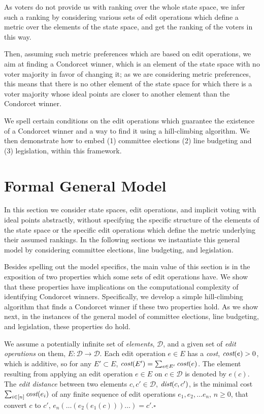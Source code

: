 \documentclass{llncs}
\newcommand{\qqed}{\hfill$\square$}
\newcommand{\calD}{\mathcal{D}}
\newcommand{\dist}{\emph{dist}}
\newcommand{\cost}{\emph{cost}}
\begin{document}
As voters do not provide us with ranking over the whole state space, we infer such a ranking by considering various sets of edit operations which define a metric over the elements of the state space, and get the ranking of the voters in this way.

Then, assuming such metric preferences which are based on edit operations, we aim at finding a Condorcet winner, which is an element of the state space with no voter majority in favor of changing it; as we are considering metric preferences, this means that there is no other element of the state space for which there is a voter majority whose ideal points are closer to another element than the Condorcet winner.

We spell certain conditions on the edit operations which guarantee the existence of a Condorcet winner and a way to find it using a hill-climbing algorithm. We then demonstrate how to embed (1) committee elections (2) line budgeting and (3) legislation, within this framework.


\section{Formal General Model}

In this section we consider state spaces, edit operations, and implicit voting with ideal points abstractly, without specifying the specific structure of the elements of the state space or the specific edit operations which define the metric underlying their assumed rankings.
%
In the following sections we instantiate this general model by considering committee elections, line budgeting, and legislation.

Besides spelling out the model specifics, the main value of this section is in the exposition of two properties which some sets of edit operations have.  We show that these properties have implications on the computational complexity of identifying Condorcet winners.
Specifically, we develop a simple hill-climbing algorithm that  finds a Condorcet winner if these two properties hold.
%
As we show next, in the instances of the general model of committee elections, line budgeting, and legislation, these properties do hold.

\begin{definition}
%
We assume a potentially infinite set of \emph{elements}, $\calD$, and a given set of \emph{edit operations} on them, $E: \calD \rightarrow \calD$. Each edit operation $e \in E$ has a \emph{cost}, $\cost(e) > 0$,  which is additive, so for any $E' \subset E$, $\cost(E') = \sum_{e \in E'} \cost(e)$. The element resulting from applying an edit operation $e \in E$ on $c \in \calD$ is denoted by $e(c)$.  The \emph{edit distance} between two elements $c, c' \in \calD$, $\dist(c, c')$, is the minimal cost $\sum_{i \in [n]} \cost(e_i)$ of any finite sequence of edit operations $e_1, e_2, \ldots e_n$, $n \ge 0$, that convert $c$  to $c'$, $e_n(\ldots(e_2(e_1(c)))\ldots) = c'$.\qqed  
%
\end{definition}
\end{document}
